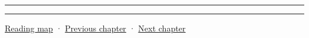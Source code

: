 \begin{center}\rule{0.5\linewidth}{0.5pt}\end{center}

\begin{center}\rule{0.5\linewidth}{0.5pt}\end{center}

\hyperref[volume-reading-map]{Reading map} · \hyperref[03-visual-computing-i-ch013-from-view-space-to-clip-space]{Previous chapter} · \hyperref[03-visual-computing-i-ch015-rasterization-foundations-and-renderer-evidence]{Next chapter}
